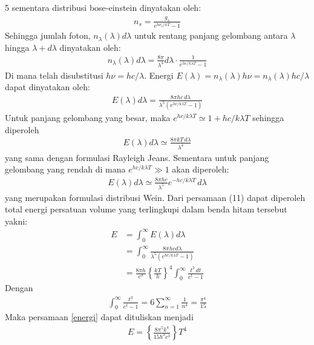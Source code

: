 \documentclass[a4paper  , 6 pt]{article}
\begin{document}
\begin{tiny}
\begin{multicols} {5}
\newline
sementara distribusi bose-einstein dinyatakan oleh:
\begin{align}
n_s = \frac{g_s}{e^{h\nu_s /kT} -1}
\end{align}
Sehingga jumlah foton, $n_\lambda (\lambda) d\lambda $ untuk rentang panjang gelombang antara $\lambda $ hingga $\lambda  + d \lambda$ dinyatakan oleh:
\begin{align}
n_\lambda (\lambda) d \lambda = \frac{8 \pi}{\lambda^4} d \lambda \cdot \frac{1}{e^{hc/ k\lambda T} - 1}
\end{align}
Di mana telah disubstitusi $h \nu  = h c/ \lambda$.
Energi $E(\lambda) =n_\lambda (\lambda) h \nu = n_\lambda (\lambda) h c/ \lambda  $ dapat dinyatakan oleh:
\begin{align}
E(\lambda) d \lambda = \frac{8 \pi h c \, d\lambda}{\lambda^5 (e^{hc/k \lambda T} - 1)} 
\end{align}
Untuk panjang gelombang yang besar, maka $e^{hc /k \lambda T} \simeq 1+ hc/ k\lambda T$ sehingga diperoleh
\begin{align}
E(\lambda ) d\lambda  \simeq \frac{8 \pi k T \, d \lambda}{\lambda^4}
\end{align}
yang sama dengan formulasi Rayleigh Jeans. 
Sementara untuk panjang gelombang yang rendah di mana $e^{hc/k \lambda T} \gg 1$ akan diperoleh:
\begin{align}
E(\lambda ) d\lambda  \simeq \frac{8 \pi h c}{\lambda^5} e^{- hc/k \lambda T} \, d \lambda 
\end{align}
yang merupakan formulasi distribusi Wein.
 Dari persamaan (11) dapat diperoleh total energi persatuan volume yang terlingkupi dalam benda hitam tersebut yakni:
 \begin{align}
 E& = \int_{0}^{\infty} E(\lambda) d \lambda \nonumber \\
 & = \int_{0}^{\infty} \frac{8 \pi h c d \lambda}{\lambda^5 (e^{hc /k \lambda T} -1)} \nonumber \\
 & = \frac{8 \pi h}{c^3} \left \lbrace \frac{kT}{h} \right \rbrace^4 \int_{0}^{\infty} \frac{t^3 \, dt }{e^t - 1}  \label{energi}
 \end{align}
 Dengan 
 \begin{align}
 \int_{0}^{\infty} \frac{t^3}{e^t -1} = 6 \sum_{n = 1}^\infty \frac{1}{n^4} = \frac{\pi^4}{15} 
 \end{align}
 Maka persamaan \ref{energi} dapat dituliskan menjadi 
 \begin{align}
\boxed{E = \left \lbrace  \frac{8 \pi^5 k^4 }{15 h^3 c^3 }\right \rbrace  T^4}

\end{align}
\end{multicols}
\end{tiny}
\end{document}
